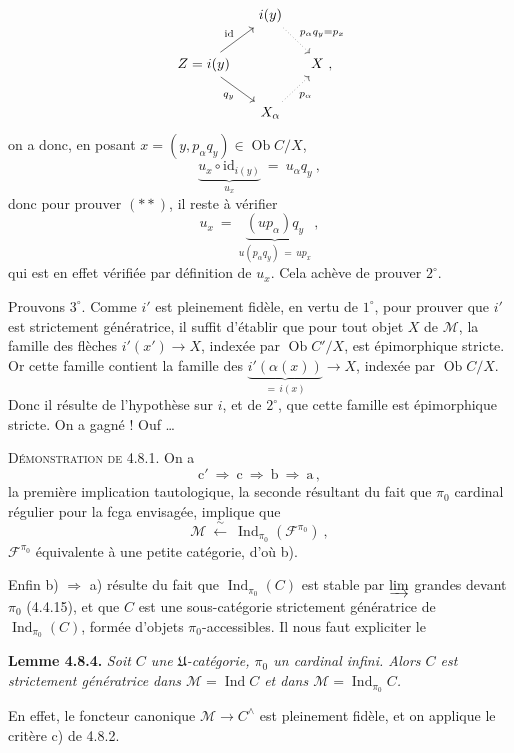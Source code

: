 \documentclass[11pt]{article}
\newcommand{\printedpage}[1]{\marginpar{\footnotesize p.~#1}}
\newcommand{\msp}[1]{\marginpar{\footnotesize [#1]}}
\newcommand{\Ob}{\operatorname{Ob}}
\newcommand{\Ind}{\operatorname{Ind}}
\begin{document}
\printedpage{69}

\[
\begin{tikzcd}[column sep=small]
 & i(y) \arrow[dr, dotted, "p_\alpha q_y=p_x"] & \\
Z=i(y) \arrow[ur, "\mathrm{id}"] \arrow[dr, "q_y"'] & & X \ , \\
 & X_\alpha \arrow[ur, dotted, "p_\alpha"'] &
\end{tikzcd}
\]
on a donc, en posant $x=(y,p_\alpha q_y)\in\Ob C/X$,
\[
\underbrace{u_x\circ\mathrm{id}_{i(y)}}_{u_x} \ = \ u_\alpha q_y \ ,
\]
donc pour prouver $(**)$, il reste à vérifier
\[
u_x \ = \ \underbrace{(up_\alpha)q_y}_{u(p_\alpha q_y)\,=\,up_x} \ ,
\]
\msp{page 197}
qui est en effet vérifiée par définition de $u_x$. Cela achève de prouver $2^\circ$.

Prouvons $3^\circ$. Comme $i'$ est pleinement fidèle, en vertu de $1^\circ$, pour prouver que $i'$ est strictement génératrice, il suffit d'établir que pour tout objet $X$ de $\mathcal{M}$, la famille des flèches $i'(x')\longrightarrow X$, indexée par $\Ob C'/X$, est épimorphique stricte. Or cette famille contient la famille des $\underbrace{i'(\alpha(x))}_{=\,i(x)}\longrightarrow X$, indexée par $\Ob C/X$. Donc il résulte de l'hypothèse sur $i$, et de $2^\circ$, que cette famille est épimorphique stricte. On a gagné ! Ouf \dots

\textsc{Démonstration de 4.8.1.} On a
\[
\mathrm{c}' \ \Longrightarrow \ \mathrm{c} \ \Longrightarrow \ \mathrm{b} \ \Longrightarrow \ \mathrm{a} \, ,
\]
la première implication tautologique, la seconde résultant du fait que $\pi_0$ cardinal régulier pour la fcga envisagée, implique que
\[
\mathcal{M} \ \xleftarrow{\ \sim\ } \ \Ind_{\pi_0}(\mathcal{F}^{\pi_0}) \ ,
\]
$\mathcal{F}^{\pi_0}$ équivalente à une petite catégorie, d'où b).

\msp{page 198}
Enfin b) $\Longrightarrow$ a) résulte du fait que $\Ind_{\pi_0}(C)$ est stable par $\varinjlim$ grandes devant $\pi_0$ (4.4.15), et que $C$ est une sous-catégorie strictement génératrice de $\Ind_{\pi_0}(C)$, formée d'objets $\pi_0$-accessibles. Il nous faut expliciter le

\textbf{Lemme 4.8.4.} \textit{Soit $C$ une $\mathfrak{U}$-catégorie, $\pi_0$ un cardinal infini. Alors $C$ est strictement génératrice dans $\mathcal{M}=\Ind C$ et dans $\mathcal{M}=\Ind_{\pi_0}C$.}

\msp{page 199}
En effet, le foncteur canonique $\mathcal{M}\longrightarrow C^\wedge$ est pleinement fidèle, et on applique le critère c) de 4.8.2.
\end{document}

